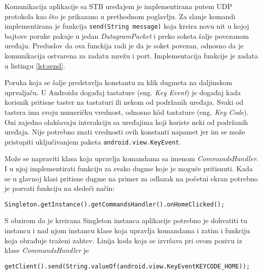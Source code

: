 \documentclass[struktura.tex]{subfiles}
\begin{document}
Komunikacija aplikacije sa STB uređajem je implementirana putem UDP protokola kao što je prikazano u prethodnom poglavlju. Za slanje komandi implementirana je funkcija \verb|send(String message)| koja kreira novu nit u kojoj bajtove poruke pakuje u jedan \textit{DatagramPacket}\cite{sajt:datagram} i preko soketa šalje povezanom uređaju. Preduslov da ova funckija radi je da je soket povezan, odnosno da je komunikacija ostvarena za zadatu mrežu i port. Implementacija funkcije je zadata u listingu \ref{lst:send}.



Poruka koja se šalje predstavlja konstantu za klik dugmeta na daljinskom uprvaljaču. U Androidu događaj tastature (eng. \textit{Key Event}) je događaj kada korisnik pritisne taster na tastaturi ili nekom od podržanih uređaja. Svaki od tastera ima svoju numeričku vrednost, odnosno k\^{o}d tastature (eng.\textit{ Key Code}). Oni zajedno olakšavaju interakciju sa uređajima koji koriste neki od podržanih uređaja. Nije potrebno znati vrednosti ovih konstanti napamet jer im se može pristupiti uključivanjem paketa \verb|android.view.KeyEvent|. 

Može se napraviti klasa koja upravlja komandama sa imenom \textit{CommandsHandler}. I u njoj implementirati funkciju za svako dugme koje je moguće pritisnuti. Kada se u glavnoj klasi pritisne dugme na primer za odlazak na početni ekran potrebno je pozvati funkciju na sledeći način: 

\verb|Singleton.getInstance().getCommandsHandler().onHomeClicked();|

S obzirom da je kreirana Singleton instanca aplikacije potrebno je dohvatiti tu instancu i nad njom instancu klase koja upravlja komandama i zatim i funkciju koja obrađuje traženi zahtev. Linija koda koja se izvršava pri ovom pozivu iz klase \textit{CommandsHandler} je 

\verb|getClient().send(String.valueOf(android.view.KeyEventKEYCODE_HOME));|
\end{document}
